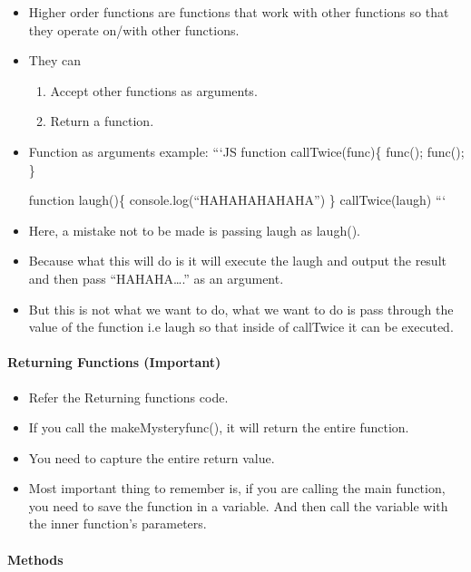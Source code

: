 \documentclass[
  paper=a4,
  ,captions=tableheading
]{scrartcl}
\providecommand{\tightlist}{%
  \setlength{\itemsep}{0pt}\setlength{\parskip}{0pt}}
\begin{document}
\begin{itemize}
\item
  Higher order functions are functions that work with other functions so
  that they operate on/with other functions.
\item
  They can

  \begin{enumerate}
  \def\labelenumi{\arabic{enumi}.}
  \tightlist
  \item
    Accept other functions as arguments.
  \item
    Return a function.
  \end{enumerate}
\item
  Function as arguments example: ```JS function callTwice(func)\{
  func(); func(); \}

  function laugh()\{ console.log(``HAHAHAHAHAHA'') \} callTwice(laugh)
  ```
\item
  Here, a mistake not to be made is passing laugh as laugh().
\item
  Because what this will do is it will execute the laugh and output the
  result and then pass ``HAHAHA\ldots.'' as an argument.
\item
  But this is not what we want to do, what we want to do is pass through
  the value of the function i.e laugh so that inside of callTwice it can
  be executed.
\end{itemize}

\hypertarget{returning-functions-important}{%
\paragraph{Returning Functions
(Important)}\label{returning-functions-important}}

\begin{itemize}
\tightlist
\item
  Refer the Returning functions code.
\item
  If you call the makeMysteryfunc(), it will return the entire function.
\item
  You need to capture the entire return value.
\item
  Most important thing to remember is, if you are calling the main
  function, you need to save the function in a variable. And then call
  the variable with the inner function's parameters.
\end{itemize}

\hypertarget{methods}{%
\paragraph{Methods}\label{methods}}
\end{document}
